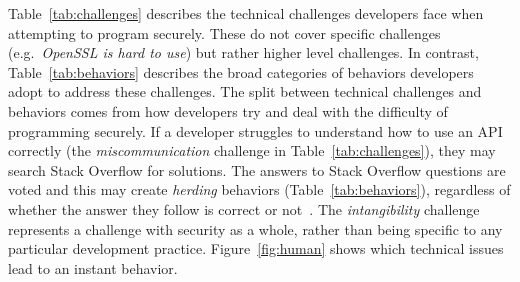 \documentclass[conference]{IEEEtran}
\begin{document}
 Table~\ref{tab:challenges} describes the technical challenges developers face when attempting to program securely. These do not cover specific challenges  (e.g.~\emph{OpenSSL is hard to use}) but rather higher level challenges. In contrast, Table~\ref{tab:behaviors} describes the broad categories of behaviors developers adopt to address these challenges.
%
The split between technical challenges and behaviors comes from how developers try and deal with the difficulty of programming securely. If a developer struggles to understand how to use an API correctly (the \emph{miscommunication} challenge in Table~\ref{tab:challenges}), they may search Stack Overflow for solutions. The answers to Stack Overflow questions are voted and this may create \emph{herding} behaviors (Table~\ref{tab:behaviors}), regardless of whether the answer they follow is correct or not~\cite{emmasurface2020}. The \emph{intangibility} challenge represents a challenge with security as a whole, rather than being specific to any particular development practice. Figure~\ref{fig:human} shows which technical issues lead to an instant behavior. 
\end{document}
